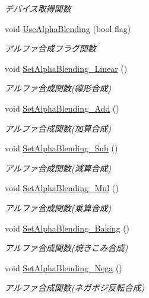 \begin{DoxyCompactItemize}
\begin{DoxyCompactList}\small\item\em デバイス取得関数 \end{DoxyCompactList}\item 
void \mbox{\hyperlink{class_renderer_direct_x9_aa555dda63bdc0f4dfc28ac506d6e8d60}{Use\+Alpha\+Blending}} (bool flag)
\begin{DoxyCompactList}\small\item\em アルファ合成フラグ関数 \end{DoxyCompactList}\item 
void \mbox{\hyperlink{class_renderer_direct_x9_abfb5264cbb0bf3bacc7b4ec416ddc05a}{Set\+Alpha\+Blending\+\_\+\+Linear}} ()
\begin{DoxyCompactList}\small\item\em アルファ合成関数(線形合成) \end{DoxyCompactList}\item 
void \mbox{\hyperlink{class_renderer_direct_x9_aa552107a3d5f8a61347fe10741fd04a3}{Set\+Alpha\+Blending\+\_\+\+Add}} ()
\begin{DoxyCompactList}\small\item\em アルファ合成関数(加算合成) \end{DoxyCompactList}\item 
void \mbox{\hyperlink{class_renderer_direct_x9_a6ddbb9f801ef6b2c86ec5cd4e97b317b}{Set\+Alpha\+Blending\+\_\+\+Sub}} ()
\begin{DoxyCompactList}\small\item\em アルファ合成関数(減算合成) \end{DoxyCompactList}\item 
void \mbox{\hyperlink{class_renderer_direct_x9_a75dbeaa680610e655c6ff202591f50d7}{Set\+Alpha\+Blending\+\_\+\+Mul}} ()
\begin{DoxyCompactList}\small\item\em アルファ合成関数(乗算合成) \end{DoxyCompactList}\item 
void \mbox{\hyperlink{class_renderer_direct_x9_a083f55d941075227189769fd9807ffd1}{Set\+Alpha\+Blending\+\_\+\+Baking}} ()
\begin{DoxyCompactList}\small\item\em アルファ合成関数(焼きこみ合成) \end{DoxyCompactList}\item 
void \mbox{\hyperlink{class_renderer_direct_x9_a5018efa829bf845405ac70beef7df947}{Set\+Alpha\+Blending\+\_\+\+Nega}} ()
\begin{DoxyCompactList}\small\item\em アルファ合成関数(ネガポジ反転合成) \end{DoxyCompactList}\item 

\end{DoxyCompactItemize}

